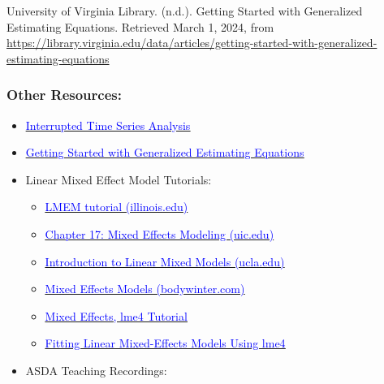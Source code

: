 \documentclass[
]{article}
\providecommand{\tightlist}{%
  \setlength{\itemsep}{0pt}\setlength{\parskip}{0pt}}
\begin{document}
University of Virginia Library. (n.d.). Getting Started with Generalized
Estimating Equations. Retrieved March 1, 2024, from
\url{https://library.virginia.edu/data/articles/getting-started-with-generalized-estimating-equations}

\hypertarget{other-resources}{%
\subsubsection{Other Resources:}\label{other-resources}}

\begin{itemize}
\tightlist
\item
  \href{https://rpubs.com/mbounthavong/MEPS_tutorial_6_itsa}{\underline{\textcolor{blue}{Interrupted Time Series Analysis}}}
\item
  \href{https://library.virginia.edu/data/articles/getting-started-with-generalized-estimating-equations\#:~:text=Generalized\%20estimating\%20equations\%2C\%20or\%20GEE,(i.e.\%2C\%20model\%20coefficients).}{\underline{\textcolor{blue}{Getting Started with Generalized Estimating Equations}}}
\item
  Linear Mixed Effect Model Tutorials:

  \begin{itemize}
  \tightlist
  \item
    \href{https://jontalle.web.engr.illinois.edu/MISC/lme4/bw_LME_tutorial.pdf}{\underline{\textcolor{blue}{LMEM tutorial (illinois.edu)}}}
  \item
    \href{https://ademos.people.uic.edu/Chapter17.html}{\underline{\textcolor{blue}{Chapter 17: Mixed Effects Modeling (uic.edu)}}}
  \item
    \href{https://stats.idre.ucla.edu/other/mult-pkg/introduction-to-linear-mixed-models/}{\underline{\textcolor{blue}{Introduction to Linear Mixed Models (ucla.edu)}}}
  \item
    \href{https://bodo-winter.net/tutorial/bw_LME_tutorial1.pdf}{\underline{\textcolor{blue}{Mixed Effects Models (bodywinter.com)}}}
  \item
    \href{https://ourcodingclub.github.io/tutorials/mixed-models/}{\underline{\textcolor{blue}{Mixed Effects, lme4 Tutorial}}}
  \item
    \href{https://cran.r-project.org/web/packages/lme4/vignettes/lmer.pdf}{\underline{\textcolor{blue}{Fitting Linear Mixed-Effects Models Using lme4}}}
  \end{itemize}
\item
  ASDA Teaching Recordings:


\end{itemize}
\end{document}
